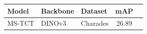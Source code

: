 \documentclass{article}
\begin{document}
\begin{table}[t]
    \centering
    \label{tab:charades_dinov3_map}
    \begin{tabular}{l l l cc}
        \toprule
        \textbf{Model} & \textbf{Backbone} & \textbf{Dataset} & \textbf{mAP} \\
        \midrule
        MS-TCT & DINOv3 & Charades & 26.89 \\
        \bottomrule
    \end{tabular}
\end{table}
\end{document}
